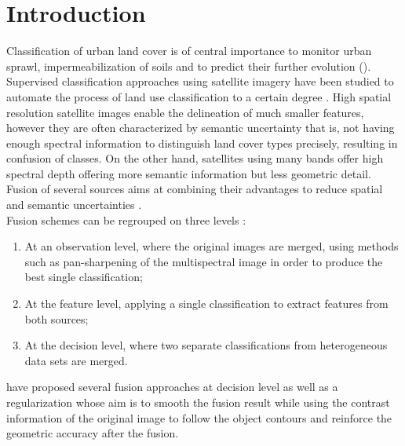 \documentclass[10pt]{article}
\begin{document}
\makeMATIS


\tableofcontents
\newpage
\section{Introduction}

Classification of urban land cover is of central importance to monitor urban sprawl, impermeabilization of soils and to predict their further evolution (\cite{kurtz_histogram_2012,kurtz_extraction_2012,wemmert_multiresolution_2009}). Supervised classification approaches using satellite imagery have been studied to automate the process of land use classification to a certain degree  \parencite{inglada_operational_2017,li_urban_2016}. High spatial resolution satellite images enable the delineation of much smaller features, however they are often characterized by semantic uncertainty that is, not having enough spectral information to distinguish land cover types precisely, resulting in confusion of classes. On the other hand, satellites using many bands offer high spectral depth offering more semantic information but less geometric detail. Fusion of several sources aims at combining their advantages to reduce spatial and semantic uncertainties \parencite{ouerghemmi_two-step_2017,fauvel_decision_fusion,hervieu_fusion_2016}. \\

Fusion schemes can be regrouped on three levels \parencite{ouerghemmi_two-step_2017}:
\begin{enumerate}
    \item At an observation level, where the original images are merged, using methods such as pan-sharpening of the multispectral image in order to produce the best single classification;
    \item At the feature level, applying a single classification to extract features from both sources;
    \item At the decision level, where two separate classifications from heterogeneous data sets are merged.
\end{enumerate}

\cite{ouerghemmi_two-step_2017} have proposed several fusion approaches at decision level as well as a regularization whose aim is to smooth the fusion result while using the contrast information of the original image to follow the object contours and reinforce the geometric accuracy after the fusion. \\
\end{document}
